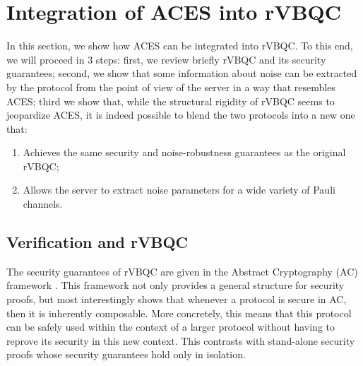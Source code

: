 \section{Integration of ACES into rVBQC}
In this section, we show how ACES can be integrated into rVBQC. To this end, we will proceed in 3 steps: first, we review briefly rVBQC and its security guarantees; second, we show that some information about noise can be extracted by the protocol from the point of view of the server in a way that resembles ACES; third we show that, while the structural rigidity of rVBQC seems to jeopardize ACES, it is indeed possible to blend the two protocols into a new one that:
\begin{enumerate}
\item Achieves the same security and noise-robustness guarantees as the original rVBQC;
\item Allows the server to extract noise parameters for a wide variety of Pauli channels.
\end{enumerate}

\subsection{Verification and rVBQC}
\label{sec:verification}

The security guarantees of rVBQC are given in the Abstract Cryptography (AC) framework \cite{MR11abstract-cryptography}. This framework not only provides a general structure for security proofs, but most interestingly shows that whenever a protocol is secure in AC, then it is inherently composable. More concretely, this means that this protocol can be safely used within the context of a larger protocol without having to reprove its security in this new context. This contrasts with stand-alone security proofs whose security guarantees hold only in isolation.

